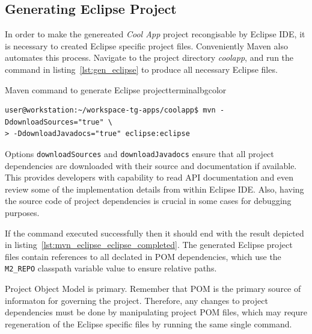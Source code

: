 \subsection{Generating Eclipse Project}

  In order to make the genereated \emph{Cool App} project recongisable by Eclipse IDE, it is necessary to created Eclipse specific project files.
  Conveniently Maven also automates this process.
  Navigate to the project directory \emph{coolapp}, and run the command in listing~\ref{lst:gen_eclipse} to produce all necessary Eclipse files.
  
  \begin{code}{Maven command to generate Eclipse project}{\label{lst:gen_eclipse}}{terminalbgcolor}
     \begin{lstlisting}
user@workstation:~/workspace-tg-apps/coolapp$ mvn -DdownloadSources="true" \
> -DdownloadJavadocs="true" eclipse:eclipse
     \end{lstlisting}
  \end{code}
    
  Options \texttt{downloadSources} and \texttt{downloadJavadocs} ensure that all project dependencies are downloaded with their source and documentation if available.
  This provides developers with capability to read API documentation and even review some of the implementation details from within Eclipse IDE.
  Also, having the source code of project dependencies is crucial in some cases for debugging purposes.

  If the command executed successfully then it should end with the result depicted in listing~\ref{lst:mvn_eclipse_eclipse_completed}. 
  The generated Eclipse project files contain references to all declated in POM dependencies, which use the \texttt{M2\_REPO} classpath variable value to ensure relative paths.

  \begin{notebox}{Project Object Model is primary.}{\label{mb:maven_primary}}
    Remember that POM is the primary source of informaton for governing the project.
    Therefore, any changes to project dependencies must be done by manipulating project POM files, which may requre regeneration of the Eclipse specific files by running the same single command.
  \end{notebox}
  

